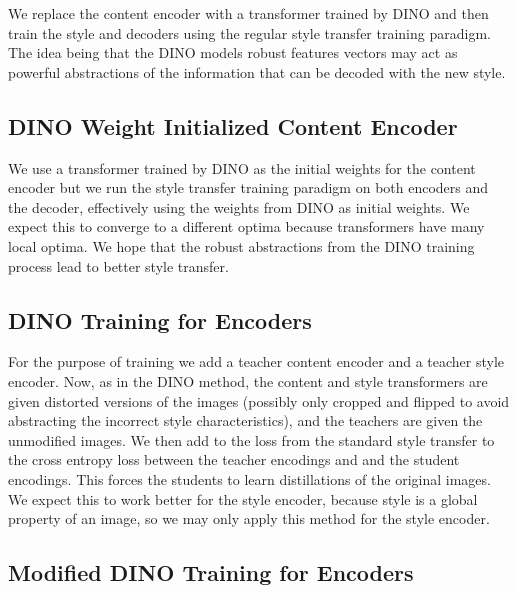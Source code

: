 \documentclass{article}
\begin{document}
We replace the content encoder with a transformer trained by DINO and then train the style and decoders using the regular style transfer training paradigm. The idea being that the DINO models robust features vectors may act as powerful abstractions of the information that can be decoded with the new style.

\subsection{DINO Weight Initialized Content Encoder}

We use a transformer trained by DINO as the initial weights for the content encoder but we run the style transfer training paradigm on both encoders and the decoder, effectively using the weights from DINO as initial weights. We expect this to converge to a different optima because transformers have many local optima. We hope that the robust abstractions from the DINO training process lead to better style transfer.

\subsection{DINO Training for Encoders}

For the purpose of training we add a teacher content encoder and a teacher style encoder. Now, as in the DINO method, the content and style transformers are given distorted versions of the images (possibly only cropped and flipped to avoid abstracting the incorrect style characteristics), and the teachers are given the unmodified images. We then add to the loss from the standard style transfer to the cross entropy loss between the teacher encodings and and the student encodings. This forces the students to learn distillations of the original images. We expect this to work better for the style encoder, because style is a global property of an image, so we may only apply this method for the style encoder.

\subsection{Modified DINO Training for Encoders}




\medskip

\nocite{*}


\end{document}
